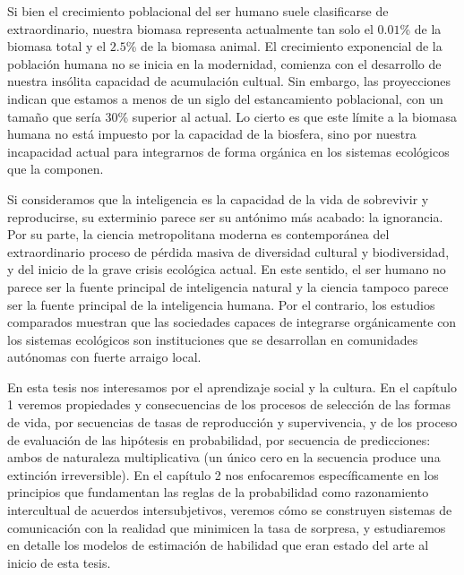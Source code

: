 \documentclass[a4paper,11pt]{book}
\theoremstyle{definition}
\begin{document}

Si bien el crecimiento poblacional del ser humano suele clasificarse de extraordinario, nuestra biomasa representa actualmente tan solo el $0.01$\% de la biomasa total y el $2.5$\% de la biomasa animal.
%
El crecimiento exponencial de la población humana no se inicia en la modernidad, comienza con el desarrollo de nuestra insólita capacidad de acumulación cultual.
%
Sin embargo, las proyecciones indican que estamos a menos de un siglo del estancamiento poblacional, con un tamaño que sería 30\% superior al actual.
%
Lo cierto es que este límite a la biomasa humana no está impuesto por la capacidad de la biosfera, sino por nuestra incapacidad actual para integrarnos de forma orgánica en los sistemas ecológicos que la componen.


Si consideramos que la inteligencia es la capacidad de la vida de sobrevivir y reproducirse, su exterminio parece ser su antónimo más acabado: la ignorancia.
%
Por su parte, la ciencia metropolitana moderna es contemporánea del extraordinario proceso de pérdida masiva de diversidad cultural y biodiversidad, y del inicio de la grave crisis ecológica actual.
%
En este sentido, el ser humano no parece ser la fuente principal de inteligencia natural y la ciencia tampoco parece ser la fuente principal de la inteligencia humana.
%
Por el contrario, los estudios comparados muestran que las sociedades capaces de integrarse orgánicamente con los sistemas ecológicos son instituciones que se desarrollan en comunidades autónomas con fuerte arraigo local.


En esta tesis nos interesamos por el aprendizaje social y la cultura.
%
En el capítulo 1 veremos propiedades y consecuencias de los procesos de selección de las formas de vida, por secuencias de tasas de reproducción y supervivencia, y de los proceso de evaluación de las hipótesis en probabilidad, por secuencia de predicciones: ambos de naturaleza multiplicativa (un único cero en la secuencia produce una extinción irreversible).
%
En el capítulo 2 nos enfocaremos específicamente en los principios que fundamentan las reglas de la probabilidad como razonamiento intercultual de acuerdos intersubjetivos, veremos cómo se construyen sistemas de comunicación con la realidad que minimicen la tasa de sorpresa, y estudiaremos en detalle los modelos de estimación de habilidad que eran estado del arte al inicio de esta tesis.

\end{document}
